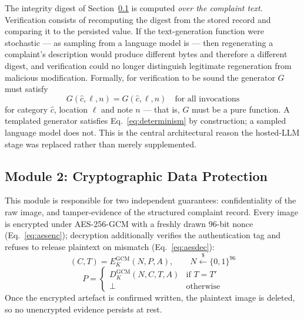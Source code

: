 \documentclass[conference]{IEEEtran}
\begin{document}
The integrity digest of Section~\ref{sec:module2} is computed \emph{over the complaint text}. Verification consists of recomputing the digest from the stored record and comparing it to the persisted value. If the text-generation function were stochastic --- as sampling from a language model is --- then regenerating a complaint's description would produce different bytes and therefore a different digest, and verification could no longer distinguish legitimate regeneration from malicious modification. Formally, for verification to be sound the generator $G$ must satisfy
\begin{equation}
G(\hat{c}, \ell, n) = G(\hat{c}, \ell, n) \quad \text{for all invocations}
\label{eq:determinism}
\end{equation}
for category $\hat{c}$, location $\ell$ and note $n$ --- that is, $G$ must be a pure function. A templated generator satisfies Eq.~\ref{eq:determinism} by construction; a sampled language model does not. This is the central architectural reason the hosted-LLM stage was replaced rather than merely supplemented.

\subsection{Module 2: Cryptographic Data Protection}
\label{sec:module2}
This module is responsible for two independent guarantees: confidentiality of the raw image, and tamper-evidence of the structured complaint record. Every image is encrypted under AES-256-GCM with a freshly drawn 96-bit nonce (Eq.~\ref{eq:aesenc}); decryption additionally verifies the authentication tag and refuses to release plaintext on mismatch (Eq.~\ref{eq:aesdec}):
\begin{equation}
(C, T) = E^{\mathrm{GCM}}_{K}(N, P, A), \qquad N \xleftarrow{\$} \{0,1\}^{96}
\label{eq:aesenc}
\end{equation}
\begin{equation}
P = \begin{cases} D^{\mathrm{GCM}}_{K}(N, C, T, A) & \text{if } T = T' \\ \bot & \text{otherwise} \end{cases}
\label{eq:aesdec}
\end{equation}
Once the encrypted artefact is confirmed written, the plaintext image is deleted, so no unencrypted evidence persists at rest.
\end{document}
